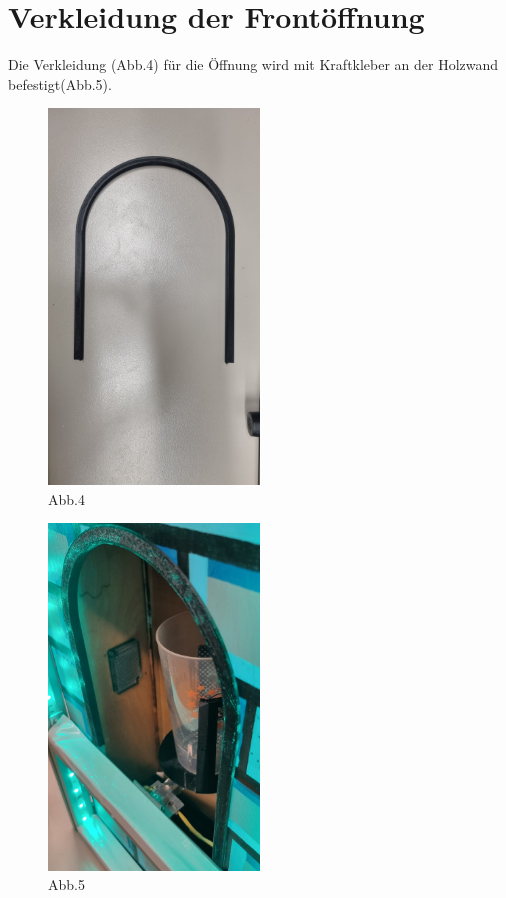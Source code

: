 \documentclass[10pt,a4paper]{report}
\begin{document}
	\section{Verkleidung der Frontöffnung} 
	Die Verkleidung (Abb.4) für die Öffnung wird mit Kraftkleber an der Holzwand befestigt(Abb.5).
\begin{figure}[htb]
		\includegraphics[width=0.5\textwidth]{Abb.4_Verkleidung.jpg}
		\centering
		\caption{Abb.4}
	\end{figure}
	\begin{figure}[htb]
		\includegraphics[width=0.5\textwidth]{Abb.5_Verkleidung_befestigt.jpg}
		\centering
		\caption{Abb.5}
	\end{figure}
\end{document}
